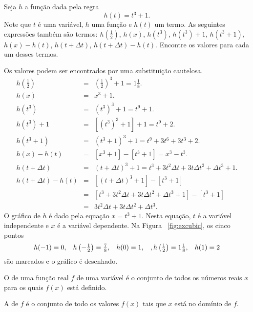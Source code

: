 \documentclass{svmono}
\begin{document}
\begin{example}\label{ex:distinctfunc}
Seja $h$ a função dada pela regra
\[
  h(t) = t^3 + 1.
\]
Note que $t$ é uma variável, $h$ uma função e $h(t)$ um termo.
As seguintes expressões também são termos: $h\left(\frac{1}{2}\right)$,
$h(x)$, $h(t^3)$, $h(t^3) + 1$, $h(t^3+1)$, $h(x) - h(t)$, $h(t + \Delta t)$,
$h(t+\Delta t) - h(t)$. Encontre os valores para cada um desses termos.

Os valores podem ser encontrados por uma substituição cautelosa.
\begin{eqnarray*}
  h\left(\frac{1}{2}\right) & = & \left(\frac{1}{2}\right)^3 + 1 = 1 \frac{1}{8}. \\
  h(x) & = & x^3 + 1. \\
  h(t^3) & = & \left(t^3\right)^3 + 1 = t^9 + 1. \\
  h(t^3) + 1 & = & \left[ \left( t^3 \right)^3 + 1 \right] + 1 = t^9 + 2. \\
  h(t^3 +  1) & = & \left( t^3 + 1 \right)^3 + 1 = t^9 + 3t^6 + 3t^3 + 2. \\
  h(x) - h(t) & = & \left[ x^3 + 1 \right] - \left[ t^3 + 1 \right] =
                    x^3 - t^3. \\
  h(t + \Delta t) & = & (t + \Delta t)^3 + 1 = t^3 + 3t^2 \Delta t +
                        3t \Delta t^2 + \Delta t^3 + 1. \\
  h(t + \Delta t) - h(t) & = &
                \left[ (t + \Delta t)^3 + 1 \right] -
                \left[ t^3 + 1 \right] \\
                         & = &
                \left[ t^3 + 3t^2 \Delta t +
                       3t \Delta t^2 + \Delta t^3 + 1 \right] -
                \left[ t^3 + 1 \right] \\
                         & = & 3t^2 \Delta t + 3t \Delta t^2 + \Delta t^3.
\end{eqnarray*}
O gráfico de $h$ é dado pela equação $x = t^3 + 1$. Nesta equação,
$t$ é a variável independente e $x$ é a variável dependente. Na Figura~%
\ref{fig:excubic}, os cinco pontos
\[
\textstyle
  h(-1) = 0, \hspace{2ex} h\left(-\frac{1}{2}\right) = \frac{7}{8}, \hspace{2ex}
  h(0) = 1, \hspace{2ex}, h\left(\frac{1}{2}\right) = 1 \frac{1}{8}, \hspace{2ex}
  h(1) = 2
\]
são marcados e o gráfico é desenhado.
\end{example}


\begin{defin}
O  de uma função real $f$ de uma variável é o conjunto
de todos os números reais $x$ para os quais $f(x)$ está definido.

A  de $f$ é o conjunto de todo os valores $f(x)$
tais que $x$ está no domínio de $f$.
\end{defin}
\end{document}
